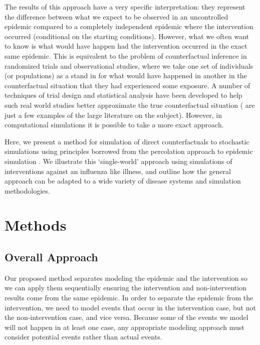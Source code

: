 \documentclass[PTRSB]{rsos}
\begin{document}
\begin{multicols}{2}
The results of this approach have a very specific interpretation: they represent the difference between what we expect to be observed in an uncontrolled epidemic compared to a completely independent epidemic where the intervention occurred (conditional on the starting conditions).
However, what we often want to know is what would have happen had the intervention occurred in the exact same epidemic.
This is equivalent to the problem of counterfactual inference in randomized trials and observational studies, where we take one set of individuals (or populations) as a stand in for what would have happened in another in the counterfactual situation that they had experienced some exposure.
A number of techniques of trial design and statistical analysis have been developed to help such real world studies better approximate the true counterfactual situation (\cite{hudgens-halloran:2008,murray-et-al:2017,buchanan:2014} are just a few examples of the large literature on the subject). %
However, in computational simulations it is possible to take a more exact approach.

Here, we present a method for simulation of direct counterfactuals to stochastic simulations using principles borrowed from the percolation approach to epidemic simulation \cite{miller-book}.
We illustrate this ‘single-world’ approach using simulations of interventions against an influenza like illness, and outline how the general approach can be adapted to a wide variety of disease systems and simulation methodologies.

\section{Methods}
\subsection*{Overall Approach}
Our proposed method separates modeling the epidemic and the intervention so we can apply them sequentially ensuring the intervention and non-intervention results come from the same epidemic.
In order to separate the epidemic from the intervention, we need to model events that occur in the intervention case, but not the non-intervention case, and vice versa.
Because some of the events we model will not happen in at least one case, any appropriate modeling approach must consider potential events rather than actual events.


\end{multicols}
\end{document}
